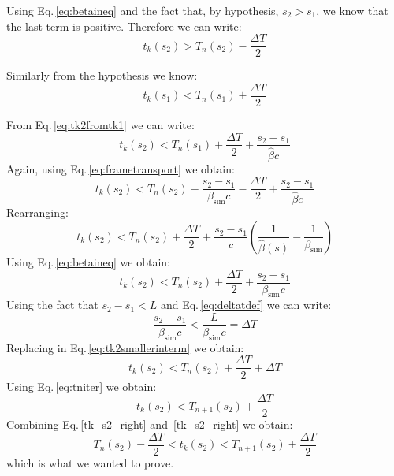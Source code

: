 Using Eq.\,\ref{eq:betaineq} and the fact that, by hypothesis, $s_2 > s_1$, we know that the last term is positive. Therefore we can write:
\begin{equation}
t_k(s_2) > T_n(s_2) - \frac{\Delta T}{2}
\label{tk_s2_right}
\end{equation}

Similarly from the hypothesis we know:
\begin{equation}
t_k(s_1) < T_n(s_1) + \frac{\Delta T}{2}
\end{equation}

From Eq.\,\ref{eq:tk2fromtk1} we can write:
\begin{equation}
t_k(s_2) < T_n(s_1) + \frac{\Delta T}{2} + \frac{s_2 - s_1}{\hat{\beta} c}
\end{equation}
Again, using Eq.\,\ref{eq:frametransport} we obtain:
\begin{equation}
t_k(s_2) < T_n(s_2) - \frac{s_2 - s_1}{{\beta}_\text{sim} c}  - \frac{\Delta T}{2} + \frac{s_2 - s_1}{\hat{\beta} c}
\end{equation}
Rearranging:
\begin{equation}
t_k(s_2) < T_n(s_2) + \frac{\Delta T}{2} + \frac{s_2 - s_1}{c} \left(
\frac{1}{\hat{\beta}(s)} - \frac{1}{\beta_\text{sim}}
\right)
\end{equation}
Using Eq.\,\ref{eq:betaineq} we obtain:
\begin{equation}
t_k(s_2) < T_n(s_2) + \frac{\Delta T}{2} + \frac{s_2 - s_1}{\beta_\text{sim}c}
\label{eq:tk2smallerinterm}
\end{equation}
Using the fact that $s_2 - s_1 < L$ and Eq.\,\ref{eq:deltatdef} we can write:
\begin{equation}
\frac{s_2 - s_1}{\beta_\text{sim}c} < \frac{L}{\beta_\text{sim}c} = \Delta T
\end{equation}
Replacing in Eq.\,\ref{eq:tk2smallerinterm} we obtain:
\begin{equation}
t_k(s_2) < T_n(s_2) + \frac{\Delta T}{2} + \Delta T
\end{equation}
Using Eq.\,\ref{eq:tniter} we obtain:
\begin{equation}
t_k(s_2) < T_{n+1}(s_2) + \frac{\Delta T}{2}
\end{equation}
Combining Eq.\,\ref{tk_s2_right} and~\ref{tk_s2_right} we obtain:
\begin{equation}
T_{n}(s_2) - \frac{\Delta T}{2} < t_k(s_2) < T_{n+1}(s_2) + \frac{\Delta T}{2}
\end{equation}
which is what we wanted to prove.

